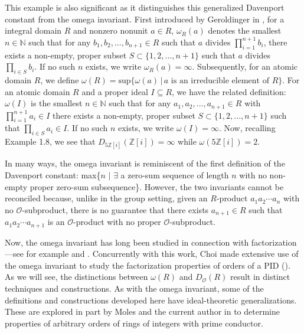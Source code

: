 \documentclass{amsart}
\theoremstyle{definition}
\newcommand{\MO}{\mathcal{O}}
\newcommand{\bbz}{\mathbb{Z}}
\newcommand{\bbn}{\mathbb{N}}
\numberwithin{equation}{section}
\begin{document}
This example is also significant as it distinguishes this generalized Davenport constant from the omega invariant. First introduced by Geroldinger in \cite{geroldinger1997chains}, for a integral domain $R$ and nonzero nonunit $a \in R$, $\omega_R(a)$ denotes the smallest $n \in \bbn$ such that for any $b_1,b_2,...,b_{n+1} \in R$ such that $a$ divides $\prod_{i=1}^{n+1}b_i$, there exists a non-empty, proper subset $S \subset \{1,2,...,n+1\}$ such that $a$ divides $\prod_{i\in S}b_i$. If no such $n$ exists, we write $\omega_R(a) = \infty$. Subsequently, for an atomic domain $R$, we define $\omega(R) = \text{sup}\{\omega(a) \,|\, a \text{ is an irreducible element of } R\}$. For an atomic domain $R$ and a proper ideal $I \subseteq R$, we have the related definition: $\omega(I)$ is the smallest $n \in \bbn$ such that for any $a_1,a_2,...,a_{n+1} \in R$ with $\prod_{i = 1}^{n+1} a_i \in I $ there exists a non-empty, proper subset $S \subset \{1,2,...,n+1\}$ such that $\prod_{i \in S} a_i \in I$. If no such $n$ exists, we write $\omega(I) = \infty$. Now, recalling Example 1.8, we see that $D_{5\bbz[i]}(\bbz[i]) = \infty$ while $\omega(5\bbz[i]) = 2$. 

In many ways, the omega invariant is reminiscent of the first definition of the Davenport constant: max\{$n$ $\vert$ $\exists$ a zero-sum sequence of length $n$ with no non-empty proper zero-sum subsequence\}. However, the two invariants cannot be reconciled because, unlike in the group setting, given an $R$-product $a_1a_2\dotsm a_n$ with no $\MO$-subproduct, there is no guarantee that there exists $a_{n+1} \in R$ such that $a_1a_2\dotsm a_{n+1}$ is an $\MO$-product with no proper $\MO$-subproduct. 

Now, the omega invariant has long been studied in connection with factorization---see for example \cite{geroldinger2006non} and \cite{geroldinger2010arithmetic}. Concurrently with this work, Choi made extensive use of the omega invariant to study the factorization properties of orders of a PID (\cite{choi2024class}). As we will see, the distinctions between $\omega(R)$ and $D_{\MO}(R)$ result in distinct techniques and constructions. As with the omega invariant, some of the definitions and constructions developed here have ideal-theoretic generalizations. These are explored in part by Moles and the current author in \cite{kettinger2025elasticity} to determine properties of arbitrary orders of rings of integers with prime conductor.
\end{document}
